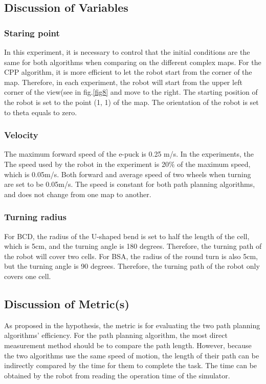 \documentclass[conference]{IEEEtran}
\begin{document}
\subsection{Discussion of Variables}

\subsubsection{Staring point}
In this experiment, it is necessary to control that the initial conditions are the same for both algorithms when comparing on the different complex maps. For the CPP algorithm, it is more efficient to let the robot start from the corner of the map. Therefore, in each experiment, the robot will start from the upper left corner of the view(see in fig.\ref{fig8} and move to the right. The starting position of the robot is set to the point (1, 1) of the map. The orientation of the robot is set to theta equals to zero.

\subsubsection{Velocity}

The maximum forward speed of the e-puck is 0.25 m/s. In the experiments, the The speed used by the robot in the experiment is 20$\%$ of the maximum speed, which is 0.05m/s. Both forward and average speed of two wheels when turning are set to be 0.05m/s. The speed is constant for both path planning algorithms, and does not change from one map to another. 

\subsubsection{Turning radius}

For BCD, the radius of the U-shaped bend is set to half the length of the cell, which is 5cm, and the turning angle is 180 degrees. Therefore, the turning path of the robot will cover two cells. For BSA, the radius of the round turn is also 5cm, but the turning angle is 90 degrees. Therefore, the turning path of the robot only covers one cell. 


\subsection{Discussion of Metric(s)}

As proposed in the hypothesis, the metric is for evaluating the two path planning algorithms' efficiency. For the path planning algorithm, the most direct measurement method should be to compare the path length. However, because the two algorithms use the same speed of motion, the length of their path can be indirectly compared by the time for them to complete the task. The time can be obtained by the robot from reading the operation time of the simulator.
\end{document}
